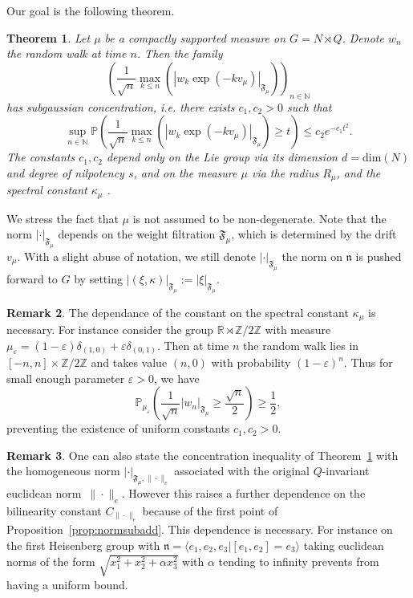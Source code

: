 \documentclass[11pt,leqno]{article}
\theoremstyle{plain}
\newtheorem{theorem}{Theorem}[section]
\theoremstyle{definition}
\newtheorem{remark}[theorem]{Remark}
\theoremstyle{remark}
\numberwithin{equation}{section}
\begin{document}
Our goal is the following theorem.

\begin{theorem}\label{thm:norm} Let $\mu$ be a compactly supported measure on $G=N \rtimes Q$. Denote $w_n$ the random walk at time $n$. Then the family
\[
\left( \frac{1}{\sqrt{n}}\max_{k\le n}\left(\left|w_k\exp\left(-kv_{\mu}\right)\right|_{\mathfrak{F}_\mu}\right) \right)_{n\in \mathbb{N}}
\]
has subgaussian concentration, i.e. there exists $c_1,c_2>0$ such that
\[
\sup_{n\in \mathbb{N}} \mathbb{P} \left( \frac{1}{\sqrt{n}}\max_{k\le n}\left(\left|w_k\exp\left(-kv_{\mu}\right)\right|_{\mathfrak{F}_\mu}\right) \ge t\right) \le c_2e^{-c_1t^2}.
\]
The constants $c_1,c_2$ depend only on the Lie group via its dimension $d=\mathrm{dim}(N)$ and degree of nilpotency $s$, and on the measure $\mu$ via  the radius $R_\mu$, and the spectral constant $\kappa_\mu$ .
\end{theorem}

We stress the fact that $\mu$ is not assumed to be non-degenerate. Note that the norm $\left|\cdot\right|_{\mathfrak{F}_\mu}$
depends on the weight filtration $\mathfrak{F}_\mu$, which is determined by the drift $v_{\mu}$. With a slight abuse of notation, we still denote  $|\cdot|_{\mathfrak{F}_\mu}$ the norm on $\mathfrak{n}$ is pushed forward to $G$ by setting $|(\xi,\kappa)|_{\mathfrak{F}_\mu}:=|\xi|_{\mathfrak{F}_\mu}$.

\begin{remark}\label{rk:balistic}
The dependance of the constant on the spectral constant $\kappa_\mu$ is necessary. For instance consider the group $\mathbb{R}\rtimes \mathbb{Z}/2\mathbb{Z}$ with measure $\mu_\varepsilon=(1-\varepsilon)\delta_{(1,0)}+\varepsilon\delta_{(0,1)}$. Then at time $n$ the random walk lies in $[-n,n]\times \mathbb{Z}/2\mathbb{Z}$ and takes value $(n,0)$ with probability $(1-\varepsilon)^n$. Thus for small enough parameter $\varepsilon>0$, we have
\[
\mathbb{P}_{\mu_\varepsilon}\left( \frac{1}{\sqrt{n}} |w_n|_{\mathfrak{F}_\mu} \ge \frac{\sqrt{n}}{2}\right) \ge \frac{1}{2},
\]
preventing the existence of uniform constants $c_1,c_2>0$.
\end{remark}

\begin{remark}\label{rk:algnorm}
One can also state the concentration inequality of Theorem~\ref{thm:norm} with the homogeneous norm $|\cdot|_{\mathfrak{F}_\mu,\|\cdot\|_e}$ associated with the original $Q$-invariant euclidean norm~$\|\cdot\|_e$. However this raises a further dependence on the bilinearity constant $C_{\|\cdot\|_e}$ because of the first point of Proposition~\ref{prop:normsubadd}. This dependence is necessary. For instance on the first Heisenberg group with $\mathfrak{n}=\langle e_1,e_2,e_3|[e_1,e_2]=e_3\rangle$ taking euclidean norms of the form $\sqrt{x_1^2+x_2^2+\alpha x_3^2}$ with $\alpha$ tending to infinity prevents from having a uniform bound.
\end{remark}
\end{document}
